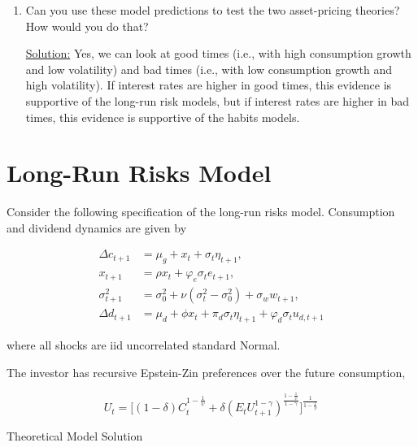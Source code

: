 \documentclass{article}
\begin{document}
\begin{enumerate}
\item Can you use these model predictions to test the two asset-pricing theories? How would you do that?

\underline{Solution:} Yes, we can look at good times (i.e., with high consumption growth and low volatility) and bad times (i.e., with low consumption growth and high volatility).  If interest rates are higher in good times, this evidence is supportive of the long-run risk models, but if interest rates are higher in bad times, this evidence is supportive of the habits models.

\end{enumerate}

\pagebreak


\section{Long-Run Risks Model}

Consider the following specification of the long-run risks model. Consumption and dividend dynamics are given by

\begin{align*}
\Delta c_{t+1} &= \mu_g + x_t + \sigma_t \eta_{t+1}, \\
x_{t+1} &= \rho x_t + \varphi_e \sigma_t e_{t+1}, \\
\sigma_{t+1}^2 &= \sigma_0^2 + \nu(\sigma_t^2 - \sigma_0^2) + \sigma_w w_{t+1},\\
\Delta d_{t+1} &= \mu_d + \phi x_t + \pi_d \sigma_t \eta_{t+1} + \varphi_d \sigma_t u_{d,t+1}
\end{align*}

where all shocks are iid uncorrelated standard Normal.

\bigskip

The investor has recursive Epstein-Zin preferences over the future consumption,

$$
U_t = \Bigg[(1-\delta)C_t^{1- \frac{1}{\psi}} + \delta (E_t U_{t+1}^{1 - \gamma})^{\frac{1-\frac{1}{\psi}}{1 - \gamma}} \Bigg]^{\frac{1}{1-\frac{1}{\psi}}}
$$

Theoretical Model Solution
\end{document}
